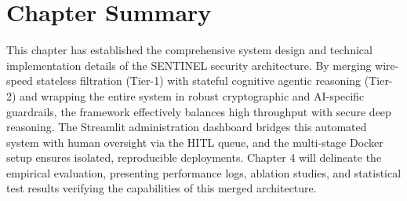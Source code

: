 \section{Chapter Summary}

This chapter has established the comprehensive system design and technical implementation details of the SENTINEL security architecture. By merging wire-speed stateless filtration (Tier-1) with stateful cognitive agentic reasoning (Tier-2) and wrapping the entire system in robust cryptographic and AI-specific guardrails, the framework effectively balances high throughput with secure deep reasoning. The Streamlit administration dashboard bridges this automated system with human oversight via the HITL queue, and the multi-stage Docker setup ensures isolated, reproducible deployments. Chapter 4 will delineate the empirical evaluation, presenting performance logs, ablation studies, and statistical test results verifying the capabilities of this merged architecture.

